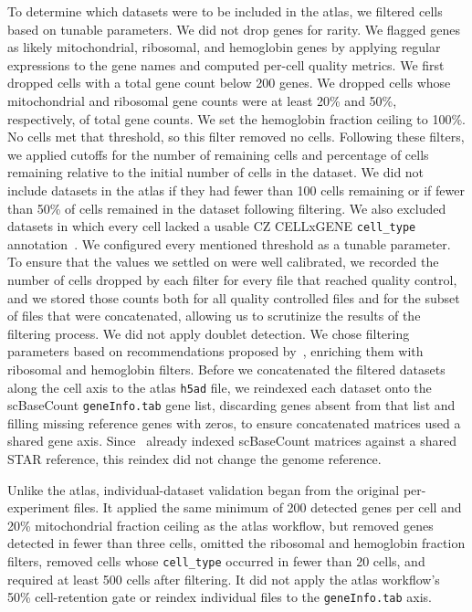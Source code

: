 \documentclass[10pt,letterpaper]{article}
\begin{document}
To determine which datasets were to be included in the atlas, we filtered cells based on tunable parameters. We did not drop genes for rarity. We flagged genes as likely mitochondrial, ribosomal, and hemoglobin genes by applying regular expressions to the gene names and computed per-cell quality metrics. We first dropped cells with a total gene count below 200 genes. We dropped cells whose mitochondrial and ribosomal gene counts were at least 20\% and 50\%, respectively, of total gene counts. We set the hemoglobin fraction ceiling to 100\%. No cells met that threshold, so this filter removed no cells. Following these filters, we applied cutoffs for the number of remaining cells and percentage of cells remaining relative to the initial number of cells in the dataset. We did not include datasets in the atlas if they had fewer than 100 cells remaining or if fewer than 50\% of cells remained in the dataset following filtering. We also excluded datasets in which every cell lacked a usable CZ CELLxGENE \texttt{cell_type} annotation~\parencite{czicellscienceprogramCZCELLxGENEDiscover2025}. We configured every mentioned threshold as a tunable parameter. To ensure that the values we settled on were well calibrated, we recorded the number of cells dropped by each filter for every file that reached quality control, and we stored those counts both for all quality controlled files and for the subset of files that were concatenated, allowing us to scrutinize the results of the filtering process. We did not apply doublet detection. We chose filtering parameters based on recommendations proposed by~\textcite{lueckenCurrentBestPractices2019}, enriching them with ribosomal and hemoglobin filters. Before we concatenated the filtered datasets along the cell axis to the atlas \texttt{h5ad} file, we reindexed each dataset onto the scBaseCount \texttt{geneInfo.tab} gene list, discarding genes absent from that list and filling missing reference genes with zeros, to ensure concatenated matrices used a shared gene axis. Since~\textcite{youngblutScBaseCountAIAgentcurated2025} already indexed scBaseCount matrices against a shared STAR reference, this reindex did not change the genome reference.

Unlike the atlas, individual-dataset validation began from the original per-experiment files. It applied the same minimum of 200 detected genes per cell and 20\% mitochondrial fraction ceiling as the atlas workflow, but removed genes detected in fewer than three cells, omitted the ribosomal and hemoglobin fraction filters, removed cells whose \texttt{cell_type} occurred in fewer than 20 cells, and required at least 500 cells after filtering. It did not apply the atlas workflow's 50\% cell-retention gate or reindex individual files to the \texttt{geneInfo.tab} axis.
\end{document}
